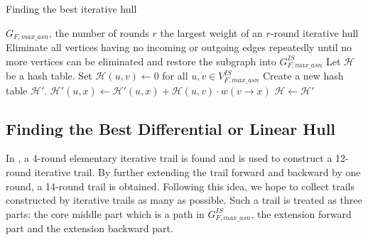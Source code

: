 \begin{algorithm}
	\caption{Finding the best iterative hull}
	\label{algo:2}
	\begin{algorithmic}[1]
		\Require $G_{F,max\_asn}$, the number of rounds $r$
		\Ensure the largest weight of an $r$-round iterative hull
		\Procedure {}{}
		\State Eliminate all vertices having no incoming or outgoing edges repeatedly until no more vertices can be eliminated and restore the subgraph into $G^{IS}_{F,max\_asn}$
		\State Let $\mathcal{H}$ be a hash table. Set $\mathcal{H}(u,v)\leftarrow 0$ for all $u,v\in V^{IS}_{F,max\_asn}$
		\State Create a new hash table $\mathcal{H}'$. 
		\State $\mathcal{H}'(u,x)\leftarrow \mathcal{H}'(u,x)+\mathcal{H}(u,v)\cdot w(v\rightarrow x)$
		\EndFor
		\EndFor
		\State $\mathcal{H}\leftarrow \mathcal{H}'$
		\EndFor
		\State {}
		\EndProcedure
	\end{algorithmic}
\end{algorithm}

\subsection{Finding the Best Differential or Linear Hull}\label{sec:fbh}

In \cite{W08}, a 4-round elementary iterative trail is found and is used to construct a 12-round iterative trail. By further extending the trail forward and backward by one round, a 14-round trail is obtained. Following this idea, we hope to collect trails constructed by iterative trails as many as possible. Such a trail is treated as three parts: the core middle part which is a path in $G^{IS}_{F,max\_asn}$, the extension forward part and the extension backward part. 

